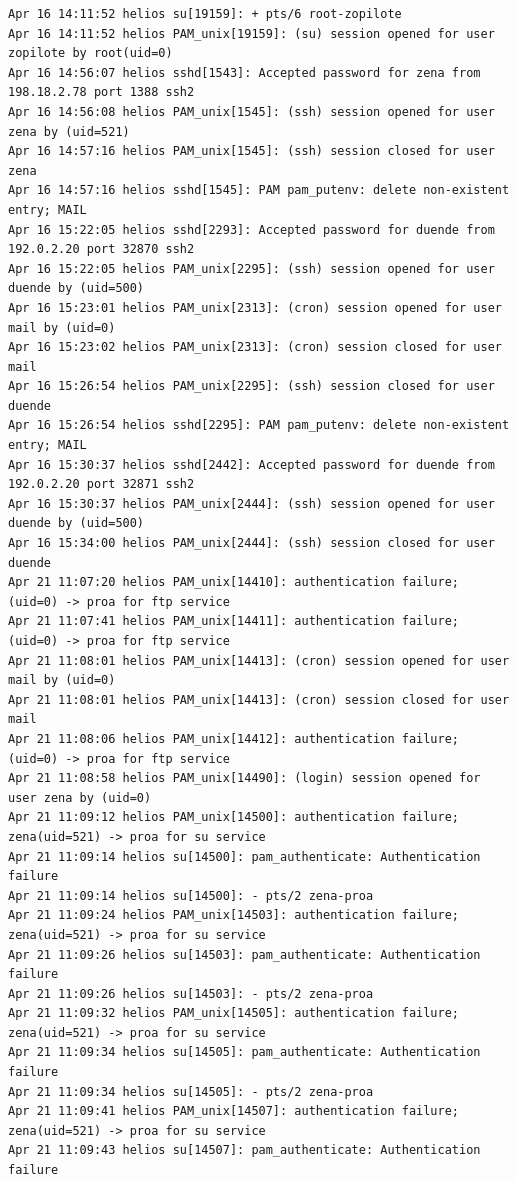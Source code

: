 \begin{lstlisting}[style=terminal]
Apr 16 14:11:52 helios su[19159]: + pts/6 root-zopilote
Apr 16 14:11:52 helios PAM_unix[19159]: (su) session opened for user zopilote by root(uid=0)
Apr 16 14:56:07 helios sshd[1543]: Accepted password for zena from 198.18.2.78 port 1388 ssh2
Apr 16 14:56:08 helios PAM_unix[1545]: (ssh) session opened for user zena by (uid=521)
Apr 16 14:57:16 helios PAM_unix[1545]: (ssh) session closed for user zena
Apr 16 14:57:16 helios sshd[1545]: PAM pam_putenv: delete non-existent entry; MAIL
Apr 16 15:22:05 helios sshd[2293]: Accepted password for duende from 192.0.2.20 port 32870 ssh2
Apr 16 15:22:05 helios PAM_unix[2295]: (ssh) session opened for user duende by (uid=500)
Apr 16 15:23:01 helios PAM_unix[2313]: (cron) session opened for user mail by (uid=0)
Apr 16 15:23:02 helios PAM_unix[2313]: (cron) session closed for user mail
Apr 16 15:26:54 helios PAM_unix[2295]: (ssh) session closed for user duende
Apr 16 15:26:54 helios sshd[2295]: PAM pam_putenv: delete non-existent entry; MAIL
Apr 16 15:30:37 helios sshd[2442]: Accepted password for duende from 192.0.2.20 port 32871 ssh2
Apr 16 15:30:37 helios PAM_unix[2444]: (ssh) session opened for user duende by (uid=500)
Apr 16 15:34:00 helios PAM_unix[2444]: (ssh) session closed for user duende
Apr 21 11:07:20 helios PAM_unix[14410]: authentication failure; (uid=0) -> proa for ftp service
Apr 21 11:07:41 helios PAM_unix[14411]: authentication failure; (uid=0) -> proa for ftp service
Apr 21 11:08:01 helios PAM_unix[14413]: (cron) session opened for user mail by (uid=0)
Apr 21 11:08:01 helios PAM_unix[14413]: (cron) session closed for user mail
Apr 21 11:08:06 helios PAM_unix[14412]: authentication failure; (uid=0) -> proa for ftp service
Apr 21 11:08:58 helios PAM_unix[14490]: (login) session opened for user zena by (uid=0)
Apr 21 11:09:12 helios PAM_unix[14500]: authentication failure; zena(uid=521) -> proa for su service
Apr 21 11:09:14 helios su[14500]: pam_authenticate: Authentication failure
Apr 21 11:09:14 helios su[14500]: - pts/2 zena-proa
Apr 21 11:09:24 helios PAM_unix[14503]: authentication failure; zena(uid=521) -> proa for su service
Apr 21 11:09:26 helios su[14503]: pam_authenticate: Authentication failure
Apr 21 11:09:26 helios su[14503]: - pts/2 zena-proa
Apr 21 11:09:32 helios PAM_unix[14505]: authentication failure; zena(uid=521) -> proa for su service
Apr 21 11:09:34 helios su[14505]: pam_authenticate: Authentication failure
Apr 21 11:09:34 helios su[14505]: - pts/2 zena-proa
Apr 21 11:09:41 helios PAM_unix[14507]: authentication failure; zena(uid=521) -> proa for su service
Apr 21 11:09:43 helios su[14507]: pam_authenticate: Authentication failure

\end{lstlisting}
